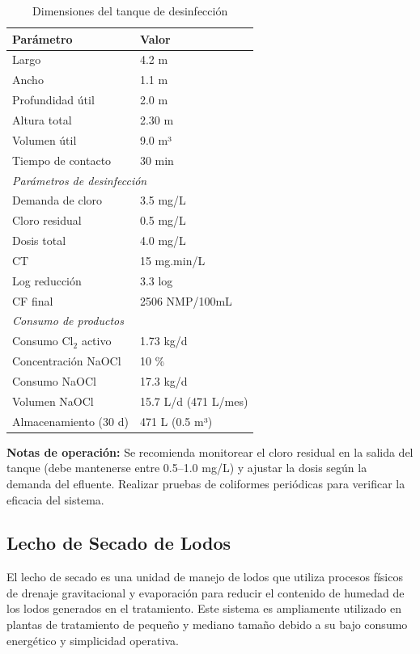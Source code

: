 \documentclass[12pt,a4paper]{article}
\begin{document}
\begin{table}[H]
\centering
\caption{Dimensiones del tanque de desinfección}
\begin{tabular}{ll}
\toprule
Parámetro & Valor \\
\midrule
Largo & 4.2 m \\
Ancho & 1.1 m \\
Profundidad útil & 2.0 m \\
Altura total & 2.30 m \\
Volumen útil & 9.0 m³ \\
Tiempo de contacto & 30 min \\
\midrule
\multicolumn{2}{l}{\textit{Parámetros de desinfección}} \\
\midrule
Demanda de cloro & 3.5 mg/L \\
Cloro residual & 0.5 mg/L \\
Dosis total & 4.0 mg/L \\
CT & 15 mg.min/L \\
Log reducción & 3.3 log \\
CF final & 2506 NMP/100mL \\
\midrule
\multicolumn{2}{l}{\textit{Consumo de productos}} \\
\midrule
Consumo Cl$_2$ activo & 1.73 kg/d \\
Concentración NaOCl & 10 \% \\
Consumo NaOCl & 17.3 kg/d \\
Volumen NaOCl & 15.7 L/d (471 L/mes) \\
Almacenamiento (30 d) & 471 L (0.5 m³) \\
\bottomrule
\end{tabular}
\end{table}

\textbf{Notas de operación:} Se recomienda monitorear el cloro residual en la salida del tanque (debe mantenerse entre 0.5--1.0 mg/L) y ajustar la dosis según la demanda del efluente. Realizar pruebas de coliformes periódicas para verificar la eficacia del sistema.

\subsection{Lecho de Secado de Lodos}

El lecho de secado es una unidad de manejo de lodos que utiliza procesos físicos de drenaje gravitacional y evaporación para reducir el contenido de humedad de los lodos generados en el tratamiento. Este sistema es ampliamente utilizado en plantas de tratamiento de pequeño y mediano tamaño debido a su bajo consumo energético y simplicidad operativa.
\end{document}
